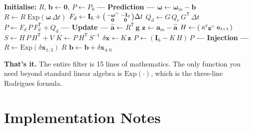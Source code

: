 \documentclass[11pt,letterpaper]{article}
\newcommand{\expmap}{\mathrm{Exp}}
\newcommand{\eye}{\mathbf{I}}
\begin{document}
\begin{algorithm}[H]
\caption{SO(3) Error-State EKF for Attitude Estimation}
\begin{algorithmic}[1]
\State \textbf{Initialise:} $R$, $\mathbf{b} \leftarrow \mathbf{0}$,
  $P \leftarrow P_0$
  \State \textbf{--- Prediction ---}
  \State $\bm{\omega} \leftarrow \bm{\omega}_m - \mathbf{b}$
  \State $R \leftarrow R \;\expmap(\bm{\omega}\,\Delta t)$
  \State $F_{d} \leftarrow \eye_{6}
    + \begin{psmallmatrix}
      -\bm{\omega}^{\wedge} & -\eye_{3} \\
      \mathbf{0} & \mathbf{0}
    \end{psmallmatrix} \Delta t$
  \State $Q_{d} \leftarrow G\,Q_{c}\,G^{\mathsf{T}}\,\Delta t$
  \State $P \leftarrow F_{d}\,P\,F_{d}^{\mathsf{T}} + Q_{d}$
  \Statex
    \State \textbf{--- Update ---}
    \State $\hat{\mathbf{a}} \leftarrow R^{\mathsf{T}}\,\mathbf{g}$
    \State $\mathbf{z} \leftarrow \mathbf{a}_m - \hat{\mathbf{a}}$
    \State $H \leftarrow
      \begin{psmallmatrix}
        R^{\mathsf{T}}\mathbf{g}^{\wedge} & \mathbf{0}_{3\times 3}
      \end{psmallmatrix}$
    \State $S \leftarrow H\,P\,H^{\mathsf{T}} + V$
    \State $K \leftarrow P\,H^{\mathsf{T}}\,S^{-1}$
    \State $\delta\mathbf{x} \leftarrow K\,\mathbf{z}$
    \State $P \leftarrow (\eye_{6} - K\,H)\,P$
    \Statex
    \State \textbf{--- Injection ---}
    \State $R \leftarrow
      \expmap(\delta\mathbf{x}_{1:3})\; R$
    \State $\mathbf{b} \leftarrow
      \mathbf{b} + \delta\mathbf{x}_{4:6}$
  \EndIf
\EndFor
\end{algorithmic}
\end{algorithm}

\textbf{That's it.}  The entire filter is 15 lines of mathematics.
The only function you need beyond standard linear algebra is
$\expmap(\cdot)$, which is the three-line Rodrigues formula.

\newpage
\section{Implementation Notes}
\end{document}
